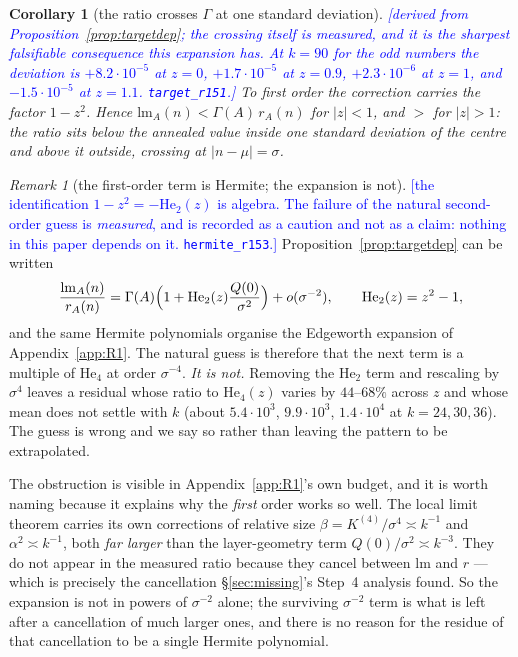 \documentclass[11pt,a4paper]{article}
\theoremstyle{plain}
\newtheorem{corollary}[theorem]{Corollary}
\theoremstyle{definition}
\theoremstyle{remark}
\newtheorem{remark}[theorem]{Remark}
\newcommand{\STATUS}[1]{\textcolor{blue}{\textsf{[#1]}}}
\begin{document}
\begin{corollary}[the ratio crosses $\Gamma$ at one standard deviation]\label{cor:crossing}
\STATUS{derived from Proposition~\ref{prop:targetdep}; the crossing itself is measured, and it is
the sharpest falsifiable consequence this expansion has. At $k=90$ for the odd numbers the
deviation is $+8.2\cdot10^{-5}$ at $z=0$, $+1.7\cdot10^{-5}$ at $z=0.9$, $+2.3\cdot10^{-6}$ at
$z=1$, and $-1.5\cdot10^{-5}$ at $z=1.1$. \texttt{target\_r151}.}
To first order the correction carries the factor $1-z^{2}$. Hence
$\mathrm{lm}_A(n)<\Gamma(A)\,r_A(n)$ for $|z|<1$, and $>$ for $|z|>1$: \emph{the ratio sits below
the annealed value inside one standard deviation of the centre and above it outside, crossing at
$|n-\mu|=\sigma$.}
\end{corollary}

\begin{remark}[the first-order term is Hermite; the expansion is not]\label{rem:nohigher}
\STATUS{the identification $1-z^{2}=-\mathrm{He}_2(z)$ is algebra. The failure of the natural
second-order guess is \emph{measured}, and is recorded as a caution and not as a claim: nothing
in this paper depends on it. \texttt{hermite\_r153}.}
Proposition~\ref{prop:targetdep} can be written
\[
  \frac{\mathrm{lm}_A(n)}{r_A(n)}
  =\Gamma(A)\Bigl(1+\mathrm{He}_2(z)\frac{Q(0)}{\sigma^{2}}\Bigr)+o(\sigma^{-2}),
  \qquad \mathrm{He}_2(z)=z^{2}-1,
\]
and the same Hermite polynomials organise the Edgeworth expansion of Appendix~\ref{app:R1}. The
natural guess is therefore that the next term is a multiple of $\mathrm{He}_4$ at order
$\sigma^{-4}$. \emph{It is not.} Removing the $\mathrm{He}_2$ term and rescaling by $\sigma^{4}$
leaves a residual whose ratio to $\mathrm{He}_4(z)$ varies by $44$--$68\%$ across $z$ and whose
mean does not settle with $k$ (about $5.4\cdot10^{3}$, $9.9\cdot10^{3}$, $1.4\cdot10^{4}$ at
$k=24,30,36$). The guess is wrong and we say so rather than leaving the pattern to be extrapolated.

The obstruction is visible in Appendix~\ref{app:R1}'s own budget, and it is worth naming because
it explains why the \emph{first} order works so well. The local limit theorem carries its own
corrections of relative size $\beta=K^{(4)}/\sigma^{4}\asymp k^{-1}$ and
$\alpha^{2}\asymp k^{-1}$, both \emph{far larger} than the layer-geometry term
$Q(0)/\sigma^{2}\asymp k^{-3}$. They do not appear in the measured ratio because they cancel
between $\mathrm{lm}$ and $r$ --- which is precisely the cancellation
\S\ref{sec:missing}'s Step~4 analysis found. So the expansion is not in powers of $\sigma^{-2}$
alone; the surviving $\sigma^{-2}$ term is what is left after a cancellation of much larger ones,
and there is no reason for the residue of that cancellation to be a single Hermite polynomial.
\end{remark}
\end{document}
